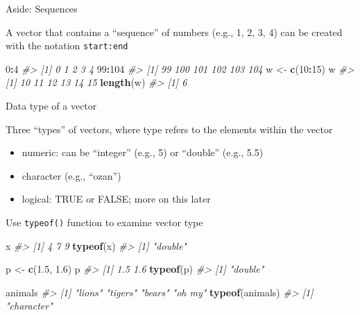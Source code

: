 \documentclass[10pt,ignorenonframetext,]{beamer}
\newenvironment{Shaded}{\begin{snugshade}}{\end{snugshade}}
\newcommand{\KeywordTok}[1]{\textcolor[rgb]{0.13,0.29,0.53}{\textbf{#1}}}
\newcommand{\DecValTok}[1]{\textcolor[rgb]{0.00,0.00,0.81}{#1}}
\newcommand{\FloatTok}[1]{\textcolor[rgb]{0.00,0.00,0.81}{#1}}
\newcommand{\StringTok}[1]{\textcolor[rgb]{0.31,0.60,0.02}{#1}}
\newcommand{\CommentTok}[1]{\textcolor[rgb]{0.56,0.35,0.01}{\textit{#1}}}
\newcommand{\OperatorTok}[1]{\textcolor[rgb]{0.81,0.36,0.00}{\textbf{#1}}}
\newcommand{\NormalTok}[1]{#1}
\providecommand{\tightlist}{%
  \setlength{\itemsep}{0pt}\setlength{\parskip}{0pt}}
\begin{document}
\begin{frame}[fragile]{Aside: Sequences}

A vector that contains a ``sequence'' of numbers (e.g., 1, 2, 3, 4) can
be created with the notation \texttt{start:end}

\begin{Shaded}
\begin{Highlighting}[]
\DecValTok{0}\OperatorTok{:}\DecValTok{4}
\CommentTok{#> [1] 0 1 2 3 4}
\DecValTok{99}\OperatorTok{:}\DecValTok{104}
\CommentTok{#> [1]  99 100 101 102 103 104}
\NormalTok{w <-}\StringTok{ }\KeywordTok{c}\NormalTok{(}\DecValTok{10}\OperatorTok{:}\DecValTok{15}\NormalTok{)}
\NormalTok{w}
\CommentTok{#> [1] 10 11 12 13 14 15}
\KeywordTok{length}\NormalTok{(w)}
\CommentTok{#> [1] 6}
\end{Highlighting}
\end{Shaded}

\end{frame}

\begin{frame}[fragile]{Data type of a vector}

Three ``types'' of vectors, where type refers to the elements within the
vector

\begin{itemize}
\tightlist
\item
  numeric: can be ``integer'' (e.g., 5) or ``double'' (e.g., 5.5)
\item
  character (e.g., ``ozan'')
\item
  logical: TRUE or FALSE; more on this later
\end{itemize}

Use \texttt{typeof()} function to examine vector type

\begin{Shaded}
\begin{Highlighting}[]
\NormalTok{x}
\CommentTok{#> [1] 4 7 9}
\KeywordTok{typeof}\NormalTok{(x)}
\CommentTok{#> [1] "double"}

\NormalTok{p <-}\StringTok{ }\KeywordTok{c}\NormalTok{(}\FloatTok{1.5}\NormalTok{, }\FloatTok{1.6}\NormalTok{)}
\NormalTok{p}
\CommentTok{#> [1] 1.5 1.6}
\KeywordTok{typeof}\NormalTok{(p)}
\CommentTok{#> [1] "double"}

\NormalTok{animals}
\CommentTok{#> [1] "lions"  "tigers" "bears"  "oh my"}
\KeywordTok{typeof}\NormalTok{(animals)}
\CommentTok{#> [1] "character"}
\end{Highlighting}
\end{Shaded}

\end{frame}
\end{document}
